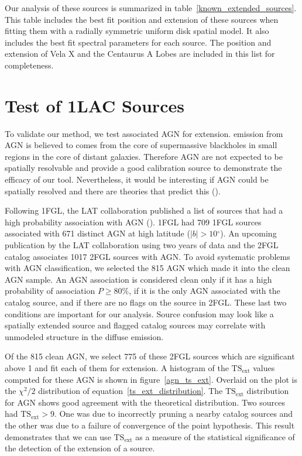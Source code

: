 \documentclass[12pt,preprint]{aastex}
\newcommand{\gev}{\text{GeV}\xspace}
\newcommand{\tsext}{{\ensuremath{\text{TS}_{\text{ext}}}}\xspace}
\renewcommand{\deg}{\ensuremath{^\circ}\xspace}
\begin{document}
Our analysis of these sources is summarized in
table~\ref{known_extended_sources}.  This table includes the best fit
position and extension of these sources when fitting them with a radially
symmetric uniform disk spatial model.  It also includes the best fit
spectral parameters for each source.  The position and extension of Vela
X and the Centaurus A Lobes are included in this list for completeness.

\section{Test of 1LAC Sources}
\label{test_1lac_sources}

To validate our method, we test associated AGN for extension.  \gev
emission from AGN is believed to comes from the core of supermassive
blackholes in small regions in the core of distant galaxies. Therefore AGN
are not expected to be spatially resolvable and provide a good calibration
source to demonstrate the efficacy of our tool. Nevertheless, it would
be interesting if AGN could be spatially resolved and there are theories
that predict this (\cite{pair_halo_paper}).

Following 1FGL, the LAT collaboration published a list of sources that
had a high probability association with AGN (\cite{first_agn_cat}).
1FGL had 709 1FGL sources associated with 671 distinct AGN at high
latitude ($|b|>10\deg$).  An upcoming publication by the LAT collaboration
using two years of data and the 2FGL catalog associates 1017 2FGL sources
with AGN.  To avoid systematic problems with AGN classification, we
selected the 815 AGN which made it into the clean AGN sample.  An AGN
association is considered clean only if it has a high probability
of association $P\ge 80\%$, if it is the only AGN associated with the
catalog source, and if there are no flags on the source in 2FGL. These
last two conditions are important for our analysis. Source
confusion may look like a spatially extended source and flagged catalog
sources may correlate with unmodeled structure in the diffuse emission.

Of the 815 clean AGN, we select 775 of these 2FGL sources which
are significant above 1 \gev and fit each of them for extension.
A histogram of the \tsext values computed for these AGN is shown in
figure~\ref{agn_ts_ext}. Overlaid on the plot is the $\chi^2/2$
distribution of equation~\ref{ts_ext_distribution}.
The \tsext distribution for AGN shows good
agreement with the theoretical distribution.  Two sources had $\tsext>9$.
One was due to incorrectly pruning a nearby catalog sources and the
other was due to a failure of convergence of the point hypothesis.
This result demonstrates that we can use \tsext as a measure of the
statistical significance of the detection of the extension of a source.
\end{document}
